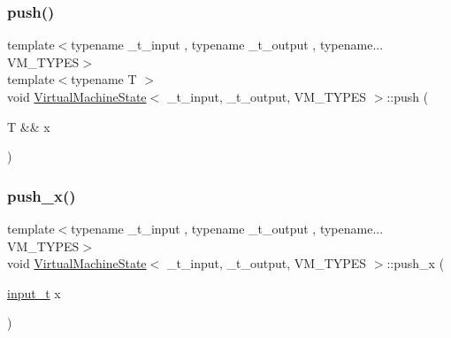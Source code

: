 \subsubsection{\texorpdfstring{push()}{push()}\hspace{0.1cm}{\footnotesize\ttfamily [2/2]}}
{\footnotesize\ttfamily template$<$typename \+\_\+t\+\_\+input , typename \+\_\+t\+\_\+output , typename... V\+M\+\_\+\+T\+Y\+P\+ES$>$ \\
template$<$typename T $>$ \\
void \hyperlink{class_virtual_machine_state}{Virtual\+Machine\+State}$<$ \+\_\+t\+\_\+input, \+\_\+t\+\_\+output, V\+M\+\_\+\+T\+Y\+P\+ES $>$\+::push (\begin{DoxyParamCaption}\item[{T \&\&}]{x }\end{DoxyParamCaption})\hspace{0.3cm}{\ttfamily [inline]}}

\mbox{\label{class_virtual_machine_state_a3d67a597eda47200e61434ff8048bc46}} 
\subsubsection{\texorpdfstring{push\+\_\+x()}{push\_x()}}
{\footnotesize\ttfamily template$<$typename \+\_\+t\+\_\+input , typename \+\_\+t\+\_\+output , typename... V\+M\+\_\+\+T\+Y\+P\+ES$>$ \\
void \hyperlink{class_virtual_machine_state}{Virtual\+Machine\+State}$<$ \+\_\+t\+\_\+input, \+\_\+t\+\_\+output, V\+M\+\_\+\+T\+Y\+P\+ES $>$\+::push\+\_\+x (\begin{DoxyParamCaption}\item[{\hyperlink{class_virtual_machine_state_aeb5e01ec57466fd3734e0c29f2b8da0a}{input\+\_\+t}}]{x }\end{DoxyParamCaption})\hspace{0.3cm}{\ttfamily [inline]}}

\mbox{\label{class_virtual_machine_state_a59185fde0c905d418a96a6acf28c15c3}} 
